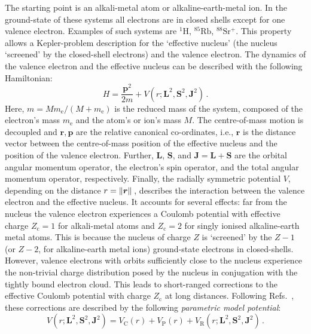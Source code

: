 \documentclass[fontsize=12pt,
               twoside=false,
               BCOR=0mm,
               DIV=14,
               overfullrule=false, %
               toc=bibliography,
               headinclude=true,
               footinclude=false]{scrartcl}
\numberwithin{equation}{section}
\begin{document}
    The starting point is an alkali-metal atom or alkaline-earth-metal ion. In
    the ground-state of these systems all electrons are in closed shells except
    for one valence electron. Examples of such systems are $\mathrm{^1H}$,
    $\mathrm{^{85}Rb}$, $\mathrm{^{88}Sr^+}$. This property allows a
    Kepler-problem description for the `effective nucleus' (the nucleus
    `screened' by the closed-shell electrons) and the valence electron. The
    dynamics of the valence electron
    and the effective nucleus can be described with the following Hamiltonian:
    \begin{equation}\label{eq:RawHamiltonian}
        H = \frac{\bm{p}^2}{2m}+V(r;\bm{L}^2,\bm{S}^2,\bm{J}^2)
    \,.
    \end{equation}
    Here, $m=Mm_\mathrm{e}\slash(M+m_\mathrm{e})$ is the reduced mass of the
    system, composed of the electron's mass $m_\mathrm{e}$ and the atom's or
    ion's mass $M$. The centre-of-mass motion is decoupled and $\bm{r},\bm{p}$
    are the relative canonical co-ordinates, i.e., $\bm{r}$ is the distance
    vector between the centre-of-mass position of the effective nucleus and the
    position of the valence electron. Further, $\bm{L}$, $\bm{S}$, and
    $\bm{J}=\bm{L}+\bm{S}$ are the orbital angular momentum operator, the
    electron's spin operator, and the total angular momentum operator,
    respectively. Finally, the radially symmetric potential $V$, depending on
    the distance $r=\norm*{\bm{r}}$, describes the interaction between the
    valence electron and the effective nucleus. It accounts for several effects:
    far from the nucleus the valence electron experiences a Coulomb potential
    with effective charge $Z_\mathrm{c}=1$ for alkali-metal atoms and
    $Z_\mathrm{c}=2$ for singly ionised alkaline-earth metal atoms. This is
    because the nucleus of charge $Z$ is `screened' by the $Z-1$ (or $Z-2$, for
    alkaline-earth metal ions) ground-state electrons in closed-shells. However,
    valence electrons with orbits sufficiently close to the nucleus experience
    the non-trivial charge distribution posed by the nucleus in conjugation with
    the tightly bound electron cloud. This leads to short-ranged corrections to
    the effective Coulomb potential with charge $Z_\mathrm{c}$ at long
    distances. Following
    Refs.~\cite{aymar1996,marinescu1994,condon1951,sibalic2017,wilkinson2025},
    these corrections are described by the following \emph{parametric model
    potential}:
    \begin{equation}\label{eq:ParametricModelPotential}
        V(r;\bm{L}^2,\bm{S}^2,\bm{J}^2)
        =
        V_\mathrm{C}(r)
        +
        V_\mathrm{P}(r)
        +
        V_\mathrm{R}(r;\bm{L}^2,\bm{S}^2,\bm{J}^2)
    \,.
    \end{equation}
\end{document}
